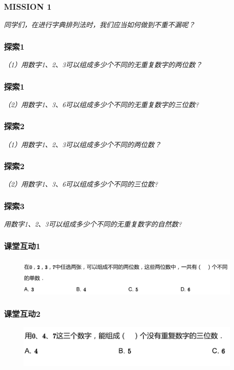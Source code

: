 \begin{frame}
    \frametitle{MISSION 1}
    \textit{同学们，在进行字典排列法时，我们应当如何做到不重不漏呢？}
\end{frame}

\begin{frame}
    \frametitle{探索1}
    \textit{（1）用数字1、2、3可以组成多少个不同的无重复数字的两位数？}
\end{frame}

\begin{frame}
    \frametitle{探索1}
    \textit{（2）用数字1、3、6可以组成多少个不同的无重复数字的三位数?}
\end{frame}

\begin{frame}
    \frametitle{探索2}
    \textit{（1）用数字1、2、3可以组成多少个不同的两位数？}
\end{frame}

\begin{frame}
    \frametitle{探索2}
    \textit{（2）用数字1、3、6可以组成多少个不同的三位数?}
\end{frame}

\begin{frame}
    \frametitle{探索3}
    \textit{用数字1、2、3可以组成多少个不同的无重复数字的自然数?}
\end{frame}

\begin{frame}
    \frametitle{课堂互动1}
    \begin{figure}[H] 
        \centering
        \includegraphics[width=1\textwidth]{./pics/Chapter_2/ketanghudong1.png}
    \end{figure}
\end{frame}

\begin{frame}
    \frametitle{课堂互动2}
    \begin{figure}[H] 
        \centering
        \includegraphics[width=1\textwidth]{./pics/Chapter_2/ketanghudong2.png}
    \end{figure}
\end{frame}

